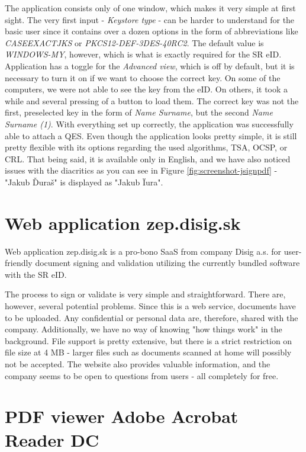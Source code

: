 \documentclass[thesismargins, english, thesislinespacing, onelinechapterstyle, upjsfrontpage]{rnthesis}
\begin{document}
The application consists only of one window, which makes it very simple at first sight.
The very first input - \textit{Keystore type} - can be harder to understand for the basic user since it contains over a dozen options in the form of abbreviations like \textit{CASEEXACTJKS} or \textit{PKCS12-DEF-3DES-40RC2}.
The default value is \textit{WINDOWS-MY}, however, which is what is exactly required for the SR eID.
Application has a toggle for the \textit{Advanced view}, which is off by default, but it is necessary to turn it on if we want to choose the correct key.
On some of the computers, we were not able to see the key from the eID. On others, it took a while and several pressing of a button to load them.
The correct key was not the first, preselected key in the form of \textit{Name Surname}, but the second \textit{Name Surname (1)}.
With everything set up correctly, the application was successfully able to attach a QES.
Even though the application looks pretty simple, it is still pretty flexible with its options regarding the used algorithms, TSA, OCSP, or CRL.
That being said, it is available only in English, and we have also noticed issues with the diacritics as you can see in Figure \ref{fig:screenshot-jsignpdf} - "Jakub Ďuraš" is displayed as "Jakub Ïura".

\section{Web application zep.disig.sk}

Web application zep.disig.sk is a pro-bono SaaS from company Disig a.s. for user-friendly document signing and validation utilizing the currently bundled software with the SR eID.


The process to sign or validate is very simple and straightforward.
There are, however, several potential problems.
Since this is a web service, documents have to be uploaded.
Any confidential or personal data are, therefore, shared with the company.
Additionally, we have no way of knowing "how things work" in the background.
File support is pretty extensive, but there is a strict restriction on file size at 4 MB - larger files such as documents scanned at home will possibly not be accepted.
The website also provides valuable information, and the company seems to be open to questions from users - all completely for free.

\section{PDF viewer Adobe Acrobat Reader DC}
\end{document}
